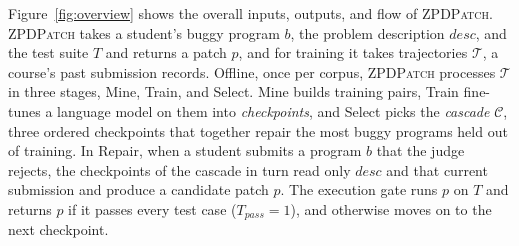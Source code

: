 \documentclass[conference]{IEEEtran}
\begin{document}
Figure~\ref{fig:overview} shows the overall inputs, outputs, and flow of \textsc{ZPDPatch}. \textsc{ZPDPatch} takes a student's buggy program \(b\), the problem description \(\mathit{desc}\), and the test suite \(T\) and returns a patch \(p\), and for training it takes trajectories \(\mathcal T\), a course's past submission records. Offline, once per corpus, \textsc{ZPDPatch} processes \(\mathcal T\) in three stages, Mine, Train, and Select. Mine builds training pairs, Train fine-tunes a language model on them into \emph{checkpoints}, and Select picks the \emph{cascade} \(\mathcal C\), three ordered checkpoints that together repair the most buggy programs held out of training. In Repair, when a student submits a program \(b\) that the judge rejects, the checkpoints of the cascade in turn read only \(\mathit{desc}\) and that current submission and produce a candidate patch \(p\). The execution gate runs \(p\) on \(T\) and returns \(p\) if it passes every test case (\(T_{\mathit{pass}}=1\)), and otherwise moves on to the next checkpoint.
\end{document}
